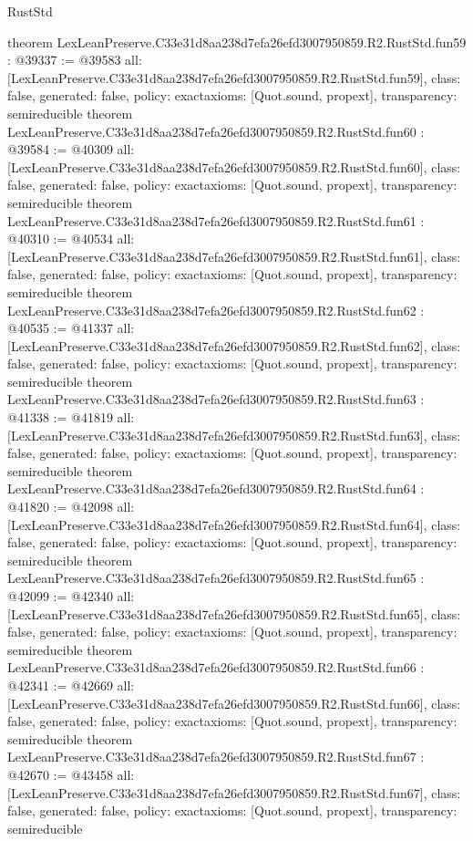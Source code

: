 \begin{lexlean}{RustStd}
\begin{coremodule}
{}
theorem LexLeanPreserve.C33e31d8aa238d7efa26efd3007950859.R2.RustStd.fun59 : @39337 := @39583 {
  all: [LexLeanPreserve.C33e31d8aa238d7efa26efd3007950859.R2.RustStd.fun59],
  class: false,
  generated: false,
  policy: exact{axioms: [Quot.sound, propext]},
  transparency: semireducible
}
theorem LexLeanPreserve.C33e31d8aa238d7efa26efd3007950859.R2.RustStd.fun60 : @39584 := @40309 {
  all: [LexLeanPreserve.C33e31d8aa238d7efa26efd3007950859.R2.RustStd.fun60],
  class: false,
  generated: false,
  policy: exact{axioms: [Quot.sound, propext]},
  transparency: semireducible
}
theorem LexLeanPreserve.C33e31d8aa238d7efa26efd3007950859.R2.RustStd.fun61 : @40310 := @40534 {
  all: [LexLeanPreserve.C33e31d8aa238d7efa26efd3007950859.R2.RustStd.fun61],
  class: false,
  generated: false,
  policy: exact{axioms: [Quot.sound, propext]},
  transparency: semireducible
}
theorem LexLeanPreserve.C33e31d8aa238d7efa26efd3007950859.R2.RustStd.fun62 : @40535 := @41337 {
  all: [LexLeanPreserve.C33e31d8aa238d7efa26efd3007950859.R2.RustStd.fun62],
  class: false,
  generated: false,
  policy: exact{axioms: [Quot.sound, propext]},
  transparency: semireducible
}
theorem LexLeanPreserve.C33e31d8aa238d7efa26efd3007950859.R2.RustStd.fun63 : @41338 := @41819 {
  all: [LexLeanPreserve.C33e31d8aa238d7efa26efd3007950859.R2.RustStd.fun63],
  class: false,
  generated: false,
  policy: exact{axioms: [Quot.sound, propext]},
  transparency: semireducible
}
theorem LexLeanPreserve.C33e31d8aa238d7efa26efd3007950859.R2.RustStd.fun64 : @41820 := @42098 {
  all: [LexLeanPreserve.C33e31d8aa238d7efa26efd3007950859.R2.RustStd.fun64],
  class: false,
  generated: false,
  policy: exact{axioms: [Quot.sound, propext]},
  transparency: semireducible
}
theorem LexLeanPreserve.C33e31d8aa238d7efa26efd3007950859.R2.RustStd.fun65 : @42099 := @42340 {
  all: [LexLeanPreserve.C33e31d8aa238d7efa26efd3007950859.R2.RustStd.fun65],
  class: false,
  generated: false,
  policy: exact{axioms: [Quot.sound, propext]},
  transparency: semireducible
}
theorem LexLeanPreserve.C33e31d8aa238d7efa26efd3007950859.R2.RustStd.fun66 : @42341 := @42669 {
  all: [LexLeanPreserve.C33e31d8aa238d7efa26efd3007950859.R2.RustStd.fun66],
  class: false,
  generated: false,
  policy: exact{axioms: [Quot.sound, propext]},
  transparency: semireducible
}
theorem LexLeanPreserve.C33e31d8aa238d7efa26efd3007950859.R2.RustStd.fun67 : @42670 := @43458 {
  all: [LexLeanPreserve.C33e31d8aa238d7efa26efd3007950859.R2.RustStd.fun67],
  class: false,
  generated: false,
  policy: exact{axioms: [Quot.sound, propext]},
  transparency: semireducible
}
\end{coremodule}
\end{lexlean}
